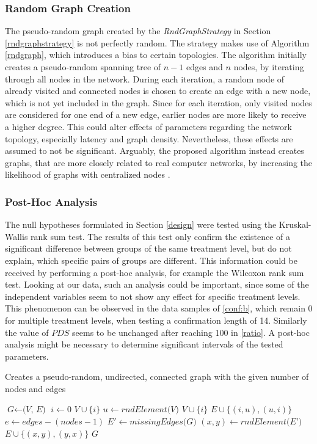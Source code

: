 \documentclass[a4paper,12pt,twoside]{report}
\begin{document}
\subsubsection{Random Graph Creation}
The pseudo-random graph created by the \textit{RndGraphStrategy} in Section \ref{rndgraphstrategy} is not perfectly random. The strategy makes use of Algorithm \ref{rndgraph}, which introduces a bias to certain topologies. The algorithm initially creates a pseudo-random spanning tree of $n-1$ edges and $n$ nodes, by iterating through all nodes in the network. During each iteration, a random node of already visited and connected nodes is chosen to create an edge with a new node, which is not yet included in the graph. Since for each iteration, only visited nodes are considered for one end of a new edge, earlier nodes are more likely to receive a higher degree. This could alter effects of parameters regarding the network topology, especially latency and graph density. Nevertheless, these effects are assumed to not be significant. Arguably, the proposed algorithm instead creates graphs, that are more closely related to real computer networks, by increasing the likelihood of graphs with centralized nodes \cite{stackoverflow}.

\subsubsection{Post-Hoc Analysis}
The null hypotheses formulated in Section \ref{design} were tested using the Kruskal-Wallis rank sum test. The results of this test only confirm the existence of a significant difference between groups of the same treatment level, but do not explain, which specific pairs of groups are different. This information could be received by performing a post-hoc analysis, for example the Wilcoxon rank sum test. Looking at our data, such an analysis could be important, since some of the independent variables seem to not show any effect for specific treatment levels. This phenomenon can be observed in the data samples of \autoref{conf:b}, which remain 0 for multiple treatment levels, when testing a confirmation length of 14. Similarly the value of $PDS$ seems to be unchanged after reaching 100 in \autoref{ratio}. A post-hoc analysis might be necessary to determine significant intervals of the tested parameters.

\begin{algorithm}
\caption{Creates a pseudo-random, undirected, connected graph with the given number of nodes and edges}\label{rndgraph}
\begin{algorithmic}[1]
\State $\textit{G} \gets \textit{(V, E)}$
\State $i \gets 0$
\State $V \cup \{i \}$
\State $u \gets \textit{rndElement(V)}$
\State $V \cup \{i \}$
\State $E \cup \{(i,u),(u,i) \}$
\EndWhile
\State $e \gets edges - (nodes-1)$
\State $E' \gets \textit{missingEdges(G)}$
\State $(x,y) \gets \textit{rndElement(E')}$
\State $E \cup \{(x,y),(y,x) \}$
\EndWhile
\State \Return $G$
\EndProcedure
\end{algorithmic}
\end{algorithm}
\end{document}
